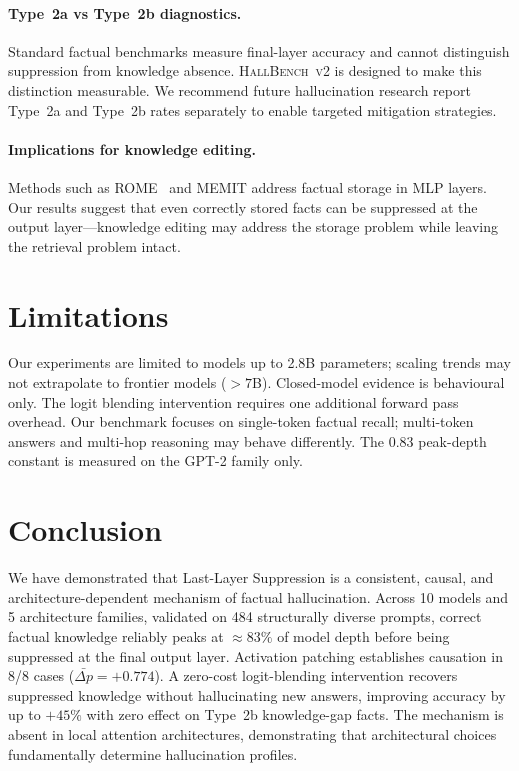 \documentclass{article}
\begin{document}
\paragraph{Type~2a vs Type~2b diagnostics.}
Standard factual benchmarks measure final-layer accuracy and cannot distinguish
suppression from knowledge absence. \textsc{HallBench~v2} is designed to make
this distinction measurable. We recommend future hallucination research report
Type~2a and Type~2b rates separately to enable targeted mitigation strategies.

\paragraph{Implications for knowledge editing.}
Methods such as ROME~\citep{meng2022locating} and MEMIT address factual
storage in MLP layers. Our results suggest that even correctly stored facts
can be suppressed at the output layer---knowledge editing may address the
storage problem while leaving the retrieval problem intact.

\section{Limitations}

Our experiments are limited to models up to 2.8B parameters; scaling trends
may not extrapolate to frontier models ($>7$B).
Closed-model evidence is behavioural only.
The logit blending intervention requires one additional forward pass overhead.
Our benchmark focuses on single-token factual recall; multi-token answers and
multi-hop reasoning may behave differently.
The 0.83 peak-depth constant is measured on the GPT-2 family only.

\section{Conclusion}

We have demonstrated that Last-Layer Suppression is a consistent, causal,
and architecture-dependent mechanism of factual hallucination.
Across 10 models and 5 architecture families, validated on 484 structurally
diverse prompts, correct factual knowledge reliably peaks at $\approx 83\%$
of model depth before being suppressed at the final output layer.
Activation patching establishes causation in 8/8 cases ($\bar{\Delta p} =
+0.774$).
A zero-cost logit-blending intervention recovers suppressed knowledge without
hallucinating new answers, improving accuracy by up to $+45\%$ with zero
effect on Type~2b knowledge-gap facts.
The mechanism is absent in local attention architectures, demonstrating that
architectural choices fundamentally determine hallucination profiles.
\end{document}
